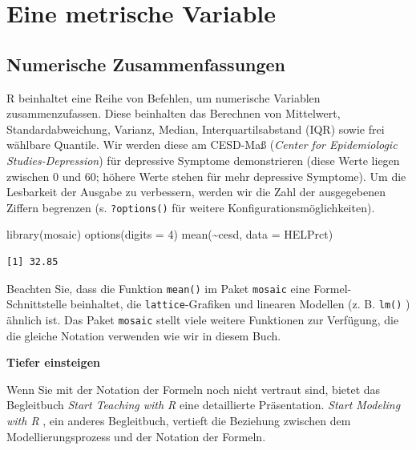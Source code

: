 \documentclass[
  ngerman,
]{scrbook}
\newenvironment{Shaded}{\begin{snugshade}}{\end{snugshade}}
\newcommand{\AttributeTok}[1]{\textcolor[rgb]{0.77,0.63,0.00}{#1}}
\newcommand{\DecValTok}[1]{\textcolor[rgb]{0.00,0.00,0.81}{#1}}
\newcommand{\FunctionTok}[1]{\textcolor[rgb]{0.00,0.00,0.00}{#1}}
\newcommand{\NormalTok}[1]{#1}
\newcommand{\SpecialCharTok}[1]{\textcolor[rgb]{0.00,0.00,0.00}{#1}}
\newenvironment{tiefereinsteigen}[1]
  {
  \begin{itemize}
  \renewcommand{\labelitemi}{
    \raisebox{2.6\height}[0pt][0pt]{
      {\setkeys{Gin}{width=7em,keepaspectratio}
        {\normalsize \textcolor{dark-fom-green}\faSearch}}
        }
  }
  \begin{blackbox}
         \bgroup\color{dark-fom-green}
          {\textbf{Tiefer einsteigen}}
        \egroup
  \item
  }
  {
  \end{blackbox}
  \end{itemize}
  }
\begin{document}
\hypertarget{metrVar}{%
\chapter{Eine metrische Variable}\label{metrVar}}

\hypertarget{numerische-zusammenfassungen}{%
\section{Numerische Zusammenfassungen}\label{numerische-zusammenfassungen}}

\textsf{R} beinhaltet eine Reihe von Befehlen, um numerische Variablen zusammenzufassen. Diese beinhalten das Berechnen von Mittelwert, Standardabweichung, Varianz, Median, Interquartilsabstand (IQR) sowie frei wählbare Quantile. Wir werden diese am CESD-Maß (\emph{Center for Epidemiologic Studies-Depression}) für depressive Symptome demonstrieren (diese Werte liegen zwischen \(0\) und \(60\); höhere Werte stehen für mehr depressive Symptome).
Um die Lesbarkeit der Ausgabe zu verbessern, werden wir die Zahl der ausgegebenen Ziffern begrenzen (s. \texttt{?options()} für weitere Konfigurationsmöglichkeiten).

\begin{Shaded}
\begin{Highlighting}[]
\FunctionTok{library}\NormalTok{(mosaic)}
\FunctionTok{options}\NormalTok{(}\AttributeTok{digits =} \DecValTok{4}\NormalTok{)}
\FunctionTok{mean}\NormalTok{(}\SpecialCharTok{\textasciitilde{}}\NormalTok{cesd, }\AttributeTok{data =}\NormalTok{ HELPrct)}
\end{Highlighting}
\end{Shaded}

\begin{verbatim}
[1] 32.85
\end{verbatim}

Beachten Sie, dass die Funktion \texttt{mean()} im Paket \texttt{mosaic} eine Formel-Schnittstelle beinhaltet, die \texttt{lattice}-Grafiken und linearen Modellen (z. B. \texttt{lm()} ) ähnlich ist. Das Paket \texttt{mosaic} stellt viele weitere Funktionen zur Verfügung, die die gleiche Notation verwenden wie wir in diesem Buch.

\begin{tiefereinsteigen}{tiefereinsteigen}
Wenn Sie mit der Notation der Formeln noch nicht vertraut sind, bietet das Begleitbuch \emph{Start Teaching with R} \autocite{TeachingR} eine detaillierte Präsentation. \emph{Start Modeling with R} \autocite{ModelingR}, ein anderes Begleitbuch, vertieft die Beziehung zwischen dem Modellierungsprozess und der Notation der Formeln.

\end{tiefereinsteigen}
\end{document}
